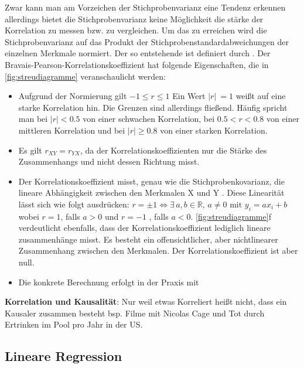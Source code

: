 Zwar kann man am Vorzeichen der Stichprobenvarianz eine Tendenz erkennen allerdings bietet die Stichprobenvarianz keine Möglichkeit die stärke der Korrelation zu messen bzw. zu vergleichen. Um das zu erreichen wird die Stichprobenvarianz auf das Produkt der Stichprobenstandardabweichungen der einzelnen Merkmale normiert. Der so entstehende  ist definiert durch . Der Bravais-Pearson-Korrelationskoeffizient hat folgende Eigenschaften, die in \cref{fig:streudiagramme} veranschaulicht werden:
\begin{itemize}[leftmargin=*]
    \itemsep0em 
    \item Aufgrund der Normierung gilt $-1 \le r \le 1$ Ein Wert $|r|~=1$ weißt auf eine starke Korrelation hin. Die Grenzen sind allerdings fließend. Häufig spricht man bei $|r| < 0.5$ von einer schwachen  Korrelation, bei $0.5 < r < 0.8$ von einer mittleren Korrelation und bei $|r| \ge 0.8$ von einer starken Korrelation.
    \item Es gilt $r_{XY} = r_{YX}$, da der Korrelationskoeffizienten nur die Stärke des Zusammenhangs und nicht dessen Richtung misst.
    \item Der Korrelationskoeffizient misst, genau wie die Stichprobenkovarianz, die lineare Abhängigkeit zwischen den Merkmalen X und Y . Diese Linearität lässt sich wie folgt ausdrücken: $r = \pm 1 \Leftrightarrow \exists\, a, b \in \mathds{R},\, a \neq 0 \text{ mit } y_i = ax_i + b$ wobei $r = 1$, falls $a > 0$ und $r = -1$ , falls $a < 0$. \cref{fig:streudiagramme}f verdeutlicht ebenfalls, dass der Korrelationskoeffizient lediglich lineare zusammenhänge misst. Es besteht ein offensichtlicher, aber nichtlinearer Zusammenhang zwischen den Merkmalen. Der Korrelationskoeffizient ist aber null.
    \item Die konkrete Berechnung erfolgt in der Praxis mit 
\end{itemize}
\textbf{Korrelation und Kausalität}: Nur weil etwas Korreliert heißt nicht, dass ein Kausaler zusammen besteht bsp. Filme mit Nicolas Cage und Tot durch Ertrinken im Pool pro Jahr in der US.  

\subsection{Lineare Regression}

